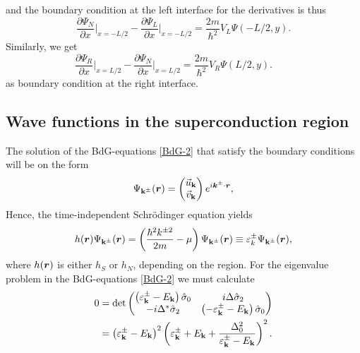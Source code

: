 and the boundary condition at the left interface for the derivatives is thus
\begin{equation}
    \frac{\partial\Psi_N}{\partial x}\bigg|_{x=-L/2} - \frac{\partial\Psi_L}{\partial x}\bigg|_{x=-L/2} = \frac{2m}{\hbar^2}V_L\Psi(-L/2,y).
\end{equation}
Similarly, we get
\begin{equation}
    \frac{\partial\Psi_R}{\partial x}\bigg|_{x=L/2} - \frac{\partial\Psi_N}{\partial x}\bigg|_{x=L/2} = \frac{2m}{\hbar^2}V_R\Psi(L/2,y). \quad \quad
\end{equation}
as boundary condition at the right interface.

\subsection{Wave functions in the superconduction region}
The solution of the BdG-equations \eqref{BdG-2} that satisfy the boundary conditions will be on the form 
\begin{equation}
    \Psi_{\mathbf{k}^{\pm}}(\boldsymbol{r}) = 
    \begin{pmatrix}
    \vec{u}_{\mathbf{k}} \\ \vec{v}_{\mathbf{k}}
    \end{pmatrix}
    e^{i\boldsymbol{k}^{\pm}\cdot \boldsymbol{r}},
\end{equation}
Hence, the time-independent Schrödinger equation yields
\begin{equation}
    h(\boldsymbol{r})\Psi_{\mathbf{k}^{\pm}}(\boldsymbol{r}) = \left(\frac{\hbar^2k^{\pm2}}{2m}-\mu\right)\Psi_{\mathbf{k}^{\pm}}(\boldsymbol{r}) \equiv \varepsilon^{\pm}_{k} \Psi_{\mathbf{k}^{\pm}}(\boldsymbol{r}),
\end{equation}
where $h(\boldsymbol{r})$ is either $h_S$ or $h_N$, depending on the region. For the eigenvalue problem in the BdG-equations \eqref{BdG-2} we must calculate
\begin{equation}
\begin{split}
    0 &= 
    \det\begin{pmatrix}
        \left(\varepsilon^{\pm}_{\mathbf{k}} - E_{\mathbf{k}}\right)\hat{\sigma}_0 & i\Delta\hat{\sigma}_2 \\
        -i\Delta^*\hat{\sigma}_2 & \left(-\varepsilon^{\pm}_{\mathbf{k}} - E_{\mathbf{k}}\right)\hat{\sigma}_0
    \end{pmatrix}
    \\&=
    \left(\varepsilon^{\pm}_{\mathbf{k}}-E_{\mathbf{k}}\right)^2\left(\varepsilon^{\pm}_{\mathbf{k}} + E_{\mathbf{k}} + \frac{\Delta_0^2}{\varepsilon^{\pm}_{\mathbf{k}} - E_{\mathbf{k}}}\right)^2.
\end{split}
\label{det}
\end{equation}
